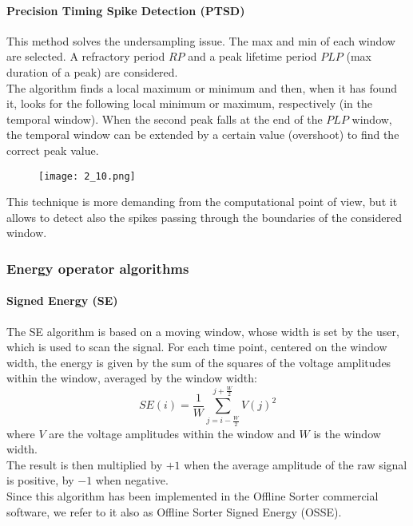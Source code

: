 \paragraph{Precision Timing Spike Detection (PTSD)}
This method solves the undersampling issue. The max and min of each window are selected.
A refractory period \(RP\) and a peak lifetime period \(PLP\) (max duration of a peak)
are considered.\\
The algorithm finds a local maximum or minimum and then, when it has found it,
looks for the following local minimum or maximum, respectively (in the temporal window).
When the second peak falls at the end of the \(PLP\) window,
the temporal window can be extended by a certain value (overshoot) to find the correct peak value.\\
\begin{figure}[H]
    \centering
    \texttt{[image: 2\_10.png]}
\end{figure}
This technique is more demanding from the computational point of view, but it allows to detect
also the spikes passing through the boundaries of the considered window.
\subsubsection{Energy operator algorithms}
\paragraph{Signed Energy (SE)}
The SE algorithm is based on a moving window, whose width is set by the user,
which is used to scan the signal. For each time point, centered on the window width,
the energy is given by the sum of the squares of the voltage amplitudes within the
window, averaged by the window width:
\begin{equation*}
    SE(i)=\frac{1}{W}\sum_{j=i-\frac{W}{2}}^{j+\frac{W}{2}}V(j)^2
\end{equation*}
where \(V\) are the voltage amplitudes within the window and \(W\) is the window width.\\
The result is then multiplied by \(+1\) when the average amplitude of the raw signal is positive,
by \(-1\) when negative.\\
Since this algorithm has been implemented in the Offline Sorter commercial software,
we refer to it also as Offline Sorter Signed Energy (OSSE).
